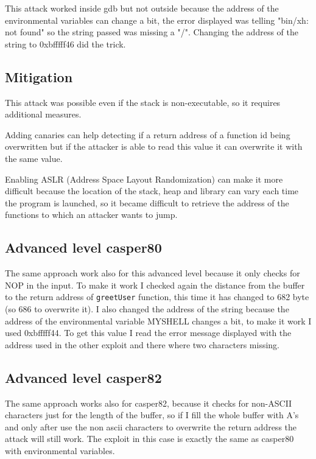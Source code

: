 \documentclass[a4paper,12pt]{article}
\begin{document}
This attack worked inside gdb but not outside because the address of the environmental variables can change a bit, the error displayed was telling "bin/xh: not found" so the string passed was missing a "/". Changing the address of the string to 0xbfffff46 did the trick.

\subsection{Mitigation}

This attack was possible even if the stack is non-executable, so it requires additional measures.

Adding canaries can help detecting if a return address of a function id being overwritten but if the attacker is able to read this value it can overwrite it with the same value.

Enabling ASLR (Address Space Layout Randomization) can make it more difficult because the location of the stack, heap and library can vary each time the program is launched, so it became difficult to retrieve the address of the functions to which an attacker wants to jump.



\subsection{Advanced level casper80}

The same approach work also for this advanced level because it only checks for NOP in the input. To make it work I checked again the distance from the buffer to the return address of \texttt{greetUser} function, this time it has changed to 682 byte (so 686 to overwrite it). I also changed the address of the string because the address of the environmental variable MYSHELL changes a bit, to make it work I used 0xbfffff44. To get this value I read the error message displayed with the address used in the other exploit and there where two characters missing.

\subsection{Advanced level casper82}

The same approach works also for casper82, because it checks for non-ASCII characters just for the length of the buffer, so if I fill the whole buffer with A's and only after use the non ascii characters to overwrite the return address the attack will still work. The exploit in this case is exactly the same as casper80 with environmental variables.
\end{document}
